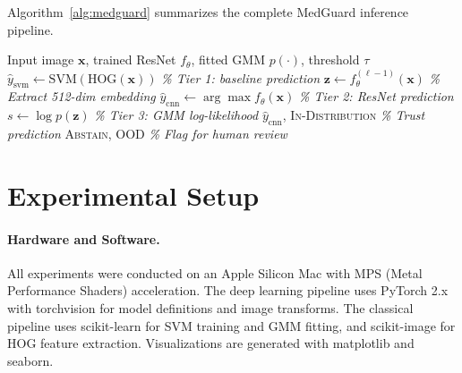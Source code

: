 \documentclass{article}
\begin{document}
Algorithm~\ref{alg:medguard} summarizes the complete MedGuard inference pipeline.

\begin{algorithm}[t]
\caption{MedGuard Inference Pipeline}
\label{alg:medguard}
\begin{algorithmic}[1]
\REQUIRE Input image $\mathbf{x}$, trained ResNet $f_\theta$, fitted GMM $p(\cdot)$, threshold $\tau$
\STATE $\hat{y}_{\text{svm}} \leftarrow \text{SVM}(\text{HOG}(\mathbf{x}))$ \hfill \textit{\% Tier 1: baseline prediction}
\STATE $\mathbf{z} \leftarrow f_\theta^{(\ell-1)}(\mathbf{x})$ \hfill \textit{\% Extract 512-dim embedding}
\STATE $\hat{y}_{\text{cnn}} \leftarrow \arg\max f_\theta(\mathbf{x})$ \hfill \textit{\% Tier 2: ResNet prediction}
\STATE $s \leftarrow \log p(\mathbf{z})$ \hfill \textit{\% Tier 3: GMM log-likelihood}
    \RETURN $\hat{y}_{\text{cnn}}$, \textsc{In-Distribution} \hfill \textit{\% Trust prediction}
\ELSE
    \RETURN \textsc{Abstain}, \textsc{OOD} \hfill \textit{\% Flag for human review}
\ENDIF
\end{algorithmic}
\end{algorithm}

\section{Experimental Setup}
\label{sec:setup}

\paragraph{Hardware and Software.}
All experiments were conducted on an Apple Silicon Mac with MPS (Metal Performance Shaders) acceleration. The deep learning pipeline uses PyTorch 2.x with torchvision for model definitions and image transforms. The classical pipeline uses scikit-learn for SVM training and GMM fitting, and scikit-image for HOG feature extraction. Visualizations are generated with matplotlib and seaborn.
\end{document}
